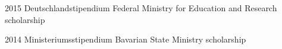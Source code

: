 {%


\award%
{%
2015
}{%
Deutschlandstipendium
}{%
Federal Ministry for Education and Research %
}{%
scholarship %
}

\award%
{%
2014
}{%
Ministeriumsstipendium
}{%
Bavarian State Ministry %
}{%
scholarship
}

}{%
}{%
}


